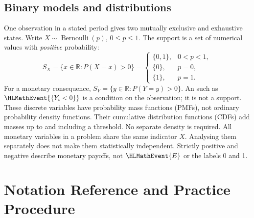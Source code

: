\clearpage\subsection{Binary models and distributions}
One observation in a stated period gives two mutually exclusive and exhaustive
states. Write $X\sim\operatorname{Bernoulli}(p)$, $0\leq p\leq1$.
The support is a set of numerical values with \emph{positive} probability:
\[
 S_X=\{x\in\mathbb R:P(X=x)>0\}
 =\begin{cases}\{0,1\},&0<p<1,\\\{0\},&p=0,\\\{1\},&p=1.\end{cases}
\]
For a monetary consequence, $S_Y=\{y\in\mathbb R:P(Y=y)>0\}$.
An  such as $\HLMathEvent{\{Y_i<0\}}$ is a condition on the observation; it is not a support.
These discrete variables have probability mass functions (PMFs), not ordinary
probability density functions. Their cumulative distribution functions (CDFs)
add masses up to and including a threshold. No separate density is required.
All monetary variables in a problem share the same indicator $X$.
Analysing them separately does not make them statistically independent.
Strictly positive and negative describe monetary payoffs, not $\HLMathEvent{E}$ or the labels 0 and 1.

\clearpage\section{Notation Reference and Practice Procedure}\label{sec:t2-c3-notation}
